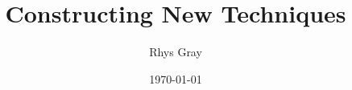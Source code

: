 \documentclass{turabian-thesis}
\title{Constructing New Techniques}
\author{Rhys Gray}
\date{\today}
\begin{document}
\maketitle






% 


%     
%     
%     
%     
%     
%     

\clearpage
\printglossary{}
\end{document}
